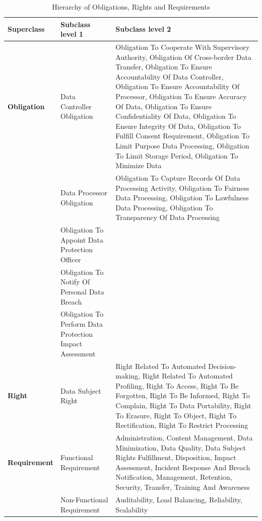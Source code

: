 \documentclass[
  a4paper,  %
  twoside,  %
  bibliography=totoc,
  headsepline,
  cleardoublepage=empty,
  parskip=half,
  draft=false
]{scrbook}
\begin{document}
\begin{table}
\centering
\begin{tabular}{ 
  |>{\raggedright\arraybackslash}p{}
  |>{\raggedright\arraybackslash}p{}
  |>{\raggedright\arraybackslash}p{}| 
}
\hline
\textbf{Superclass} & \textbf{Subclass level 1} & \textbf{Subclass level 2} \\ \hline
\textbf{Obligation} & Data Controller Obligation & Obligation To Cooperate With Supervisory Authority, Obligation Of Cross-border Data Transfer, Obligation To Ensure Accountability Of Data Controller, Obligation To Ensure Accountability Of Processor, Obligation To Ensure Accuracy Of Data, Obligation To Ensure Confidentiality Of Data, Obligation To Ensure Integrity Of Data, Obligation To Fulfill Consent Requirement, Obligation To Limit Purpose Data Processing, Obligation To Limit Storage Period, Obligation To Minimize Data \\ \cline{2-3}
 & Data Processor Obligation & Obligation To Capture Records Of Data Processing Activity, Obligation To Fairness Data Processing, Obligation To Lawfulness Data Processing, Obligation To Transparency Of Data Processing \\ \cline{2-3}
 & Obligation To Appoint Data Protection Officer &  \\ \cline{2-3}
 & Obligation To Notify Of Personal Data Breach &  \\ \cline{2-3}
 & Obligation To Perform Data Protection Impact Assessment &  \\ \hline
\textbf{Right} & Data Subject Right & Right Related To Automated Decision-making, Right Related To Automated Profiling, Right To Access, Right To Be Forgotten, Right To Be Informed, Right To Complain, Right To Data Portability, Right To Erasure, Right To Object, Right To Rectification, Right To Restrict Processing \\ \hline
\textbf{Requirement} & Functional Requirement & Administration, Content Management, Data Minimization, Data Quality, Data Subject Rights Fulfillment, Disposition, Impact Assessment, Incident Response And Breach Notification, Management, Retention, Security, Transfer, Training And Awareness \\ \cline{2-3}
 & Non-Functional Requirement & Auditability, Load Balancing, Reliability, Scalability \\ \hline
\end{tabular}
\caption{Hierarchy of Obligations, Rights and Requirements}
\end{table}\label{tab:subclasses}
\newpage
\end{document}
